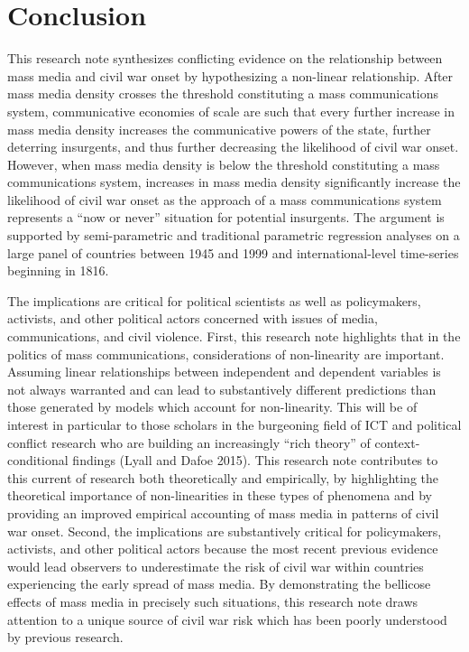 \documentclass[11pt,article,oneside]{memoir}
\begin{document}
\section{Conclusion}\label{conclusion}

This research note synthesizes conflicting evidence on the relationship
between mass media and civil war onset by hypothesizing a non-linear
relationship. After mass media density crosses the threshold
constituting a mass communications system, communicative economies of
scale are such that every further increase in mass media density
increases the communicative powers of the state, further deterring
insurgents, and thus further decreasing the likelihood of civil war
onset. However, when mass media density is below the threshold
constituting a mass communications system, increases in mass media
density significantly increase the likelihood of civil war onset as the
approach of a mass communications system represents a ``now or never''
situation for potential insurgents. The argument is supported by
semi-parametric and traditional parametric regression analyses on a
large panel of countries between 1945 and 1999 and international-level
time-series beginning in 1816.

The implications are critical for political scientists as well as
policymakers, activists, and other political actors concerned with
issues of media, communications, and civil violence. First, this
research note highlights that in the politics of mass communications,
considerations of non-linearity are important. Assuming linear
relationships between independent and dependent variables is not always
warranted and can lead to substantively different predictions than those
generated by models which account for non-linearity. This will be of
interest in particular to those scholars in the burgeoning field of ICT
and political conflict research who are building an increasingly ``rich
theory'' of context-conditional findings (Lyall and Dafoe 2015). This
research note contributes to this current of research both theoretically
and empirically, by highlighting the theoretical importance of
non-linearities in these types of phenomena and by providing an improved
empirical accounting of mass media in patterns of civil war onset.
Second, the implications are substantively critical for policymakers,
activists, and other political actors because the most recent previous
evidence would lead observers to underestimate the risk of civil war
within countries experiencing the early spread of mass media. By
demonstrating the bellicose effects of mass media in precisely such
situations, this research note draws attention to a unique source of
civil war risk which has been poorly understood by previous research.
\end{document}
